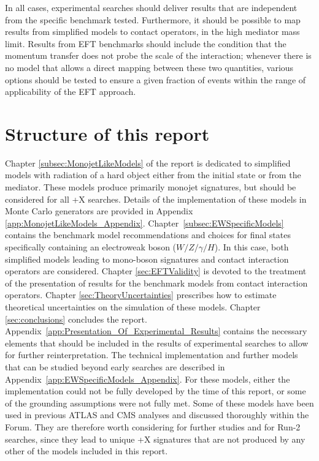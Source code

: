 In all cases, experimental searches should deliver 
results that are independent from the specific benchmark tested. 
Furthermore, it should be possible to map results from simplified models to contact operators,
in the high mediator mass limit. Results from EFT benchmarks should include the condition that
the momentum transfer does not probe the scale of the interaction; whenever there is no model
that allows a direct mapping between these two quantities, various options should be tested to 
ensure a given fraction of events within the range of applicability of the EFT approach.

\section{Structure of this report}

Chapter \ref{subsec:MonojetLikeModels} of the report is dedicated to simplified
models with radiation of a hard object either from the initial state
or from the mediator. These models produce primarily monojet signatures, 
but should be considered for all \MET{}+X searches.
Details of the implementation of these models in
Monte Carlo generators are provided in
Appendix \ref{app:MonojetLikeModels_Appendix}.
Chapter~\ref{subsec:EWSpecificModels} contains the benchmark model
recommendations and choices for final states specifically containing an electroweak 
boson ($W/Z/\gamma/H$). In this case, both 
simplified models leading to mono-boson signatures
and contact interaction operators are considered. 
Chapter \ref{sec:EFTValidity} is devoted to the treatment of the presentation of results for the benchmark
models from contact interaction operators. Chapter \ref{sec:TheoryUncertainties} prescribes how to estimate theoretical uncertainties on the simulation of these models. Chapter \ref{sec:conclusions} concludes the report.
Appendix~\ref{app:Presentation_Of_Experimental_Results} contains the necessary elements that
should be included in the results of experimental searches to allow for further reinterpretation. 
The technical implementation and further models that can be studied
beyond early searches are described in Appendix~\ref{app:EWSpecificModels_Appendix}. 
For these models, either the implementation could not be fully developed by the time of this report,
or some of the grounding assumptions were not fully met.  
Some of these models have been used in previous ATLAS and CMS analyses and discussed thoroughly within the Forum. 
They are therefore worth considering for further studies and for Run-2 searches, since they lead to unique \MET{}+X signatures 
that are not produced by any other of the models included in this report. 
